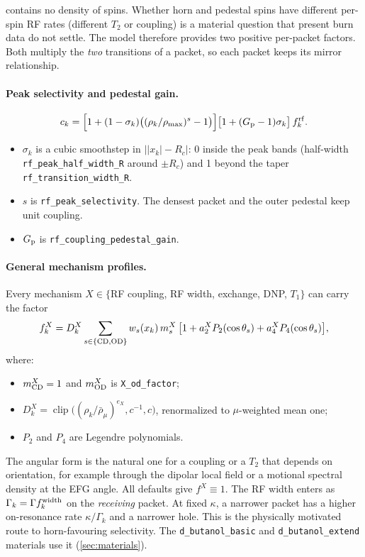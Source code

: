 \documentclass[11pt]{article}
\newcommand{\clip}{\operatorname{clip}}
\newcommand{\code}[1]{\texttt{#1}}
\begin{document}
 contains no density of spins. Whether horn and pedestal spins have different
per-spin RF rates (different \(T_2\) or coupling) is a material question that present burn data
do not settle. The model therefore provides two positive per-packet factors. Both multiply the
\emph{two} transitions of a packet, so each packet keeps its mirror relationship.

\paragraph{Peak selectivity and pedestal gain.}
\begin{equation}
c_k = \Bigl[1+(1-\sigma_k)\bigl((\rho_k/\rho_{\max})^{s}-1\bigr)\Bigr]
\bigl[1+(G_{\rm p}-1)\sigma_k\bigr]\,f^{\rm rf}_k .
\label{eq:ck}
\end{equation}
\begin{itemize}
\item \(\sigma_k\) is a cubic smoothstep in \(\bigl||x_k|-R_c\bigr|\): 0 inside the peak bands
(half-width \code{rf\_peak\_half\_width\_R} around \(\pm R_c\)) and 1 beyond the taper
\code{rf\_transition\_width\_R}.
\item \(s\) is \code{rf\_peak\_selectivity}. The densest packet and the outer pedestal keep unit
coupling.
\item \(G_{\rm p}\) is \code{rf\_coupling\_pedestal\_gain}.
\end{itemize}

\paragraph{General mechanism profiles.}
Every mechanism \(X\in\{\)RF coupling, RF width, exchange, DNP, \(T_1\}\) can carry the factor
\begin{equation}
f^X_k = D^X_k\sum_{s\in\{\rm CD,OD\}} w_s(x_k)\,m^X_s\,\bigl[1+a^X_2P_2(\cos\theta_s)+a^X_4P_4(\cos\theta_s)\bigr],
\label{eq:profile}
\end{equation}
where:
\begin{itemize}
\item \(m^X_{\rm CD}=1\) and \(m^X_{\rm OD}\) is \code{X\_od\_factor};
\item \(D^X_k=\clip\bigl((\rho_k/\bar\rho_\mu)^{e_X},c^{-1},c\bigr)\), renormalized to
\(\mu\)-weighted mean one;
\item \(P_2\) and \(P_4\) are Legendre polynomials.
\end{itemize}
The angular form is the natural one for a coupling or a \(T_2\) that depends on orientation, for
example through the dipolar local field or a motional spectral density at the EFG angle. All
defaults give \(f^X\equiv1\). The RF width enters as \(\Gamma_k=\Gamma f^{\rm width}_k\) on the
\emph{receiving} packet. At fixed \(\kappa\), a narrower packet has a higher on-resonance rate
\(\kappa/\Gamma_k\) and a narrower hole. This is the physically motivated route to
horn-favouring selectivity. The \code{d\_butanol\_basic} and \code{d\_butanol\_extend}
materials use it (\cref{sec:materials}).
\end{document}
